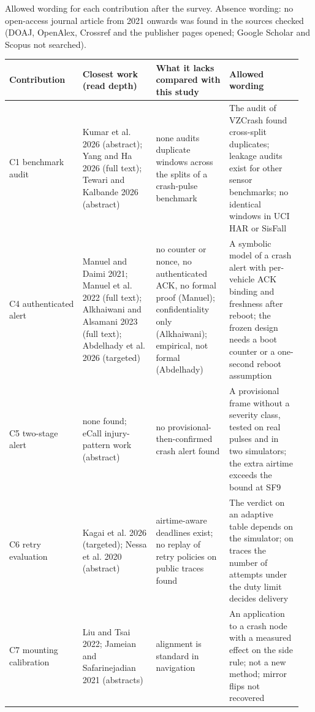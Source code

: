 Allowed wording for each contribution after the survey. Absence wording: no open-access journal article from 2021 onwards was found in the sources checked (DOAJ, OpenAlex, Crossref and the publisher pages opened; Google Scholar and Scopus not searched).

{\scriptsize\raggedright
\begin{longtable}{p{0.237\linewidth}p{0.237\linewidth}p{0.237\linewidth}p{0.237\linewidth}}
\toprule
Contribution & Closest work (read depth) & What it lacks compared with this study & Allowed wording \\
\midrule
\endhead
C1 benchmark audit & Kumar et al. 2026 (abstract); Yang and Ha 2026 (full text); Tewari and Kalbande 2026 (abstract) & none audits duplicate windows across the splits of a crash-pulse benchmark & The audit of VZCrash found cross-split duplicates; leakage audits exist for other sensor benchmarks; no identical windows in UCI HAR or SisFall \\
C4 authenticated alert & Manuel and Daimi 2021; Manuel et al. 2022 (full text); Alkhaiwani and Alsamani 2023 (full text); Abdelhady et al. 2026 (targeted) & no counter or nonce, no authenticated ACK, no formal proof (Manuel); confidentiality only (Alkhaiwani); empirical, not formal (Abdelhady) & A symbolic model of a crash alert with per-vehicle ACK binding and freshness after reboot; the frozen design needs a boot counter or a one-second reboot assumption \\
C5 two-stage alert & none found; eCall injury-pattern work (abstract) & no provisional-then-confirmed crash alert found & A provisional frame without a severity class, tested on real pulses and in two simulators; the extra airtime exceeds the bound at SF9 \\
C6 retry evaluation & Kagai et al. 2026 (targeted); Nessa et al. 2020 (abstract) & airtime-aware deadlines exist; no replay of retry policies on public traces found & The verdict on an adaptive table depends on the simulator; on traces the number of attempts under the duty limit decides delivery \\
C7 mounting calibration & Liu and Tsai 2022; Jameian and Safarinejadian 2021 (abstracts) & alignment is standard in navigation & An application to a crash node with a measured effect on the side rule; not a new method; mirror flips not recovered \\
\bottomrule
\end{longtable}}


